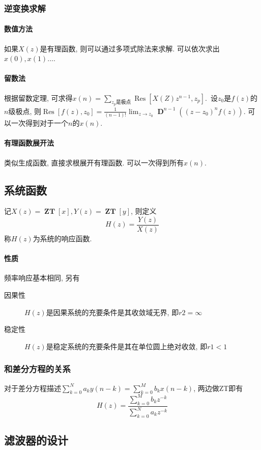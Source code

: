 \documentclass{ctexart}
\DeclareMathOperator{\ZT}{\mathbf{ZT}}
\DeclareMathOperator{\D}{\mathbf{D}}
\DeclareMathOperator{\Res}{\mathrm{Res}}
\begin{document}
\subsubsection{逆变换求解}
\paragraph{数值方法} 如果$X(z)$是有理函数, 则可以通过多项式除法来求解. 可以依次求出$x(0), x(1) \ldots$.
\paragraph{留数法} 根据留数定理, 可求得$x(n) = \sum_{z_p\text{是极点}} \Res\left[X(Z) z^{n - 1}, z_p\right]$.\
    设$z_0$是$f(z)$的$n$级极点, 则$\Res[f(z), z_0] = \frac{1}{(n-1)!} \lim_{z \to z_0} \D^{n-1} \left( (z - z_0)^n f(z) \right)$.
    可以一次得到对于一个$n$的$x(n)$.
\paragraph{有理函数展开法} 类似生成函数, 直接求根展开有理函数. 可以一次得到所有$x(n)$.

\subsection{系统函数}
    记$X(z) = \ZT[x], Y(z) = \ZT[y]$, 则定义\[H(z) = \frac{Y(z)}{X(z)}\]称$H(z)$为系统的响应函数.\par
\paragraph{性质} 频率响应基本相同, 另有\begin{description}
        \item[因果性] $H(z)$是因果系统的充要条件是其收敛域无界, 即$r2 = \infty$
        \item[稳定性] $H(z)$是稳定系统的充要条件是其在单位圆上绝对收敛, 即$r1 < 1$
    \end{description}
\subsubsection{和差分方程的关系}
    对于差分方程描述$\sum_{k = 0}^N a_k y(n - k) = \sum_{k = 0}^M b_k x(n - k)$, 两边做ZT即有
    \[
        H(z) = \frac { \sum_{k = 0}^M b_k z^{-k}} {\sum_{k = 0}^N a_k z^{-k}}
    \]

\subsection{滤波器的设计}
\end{document}
